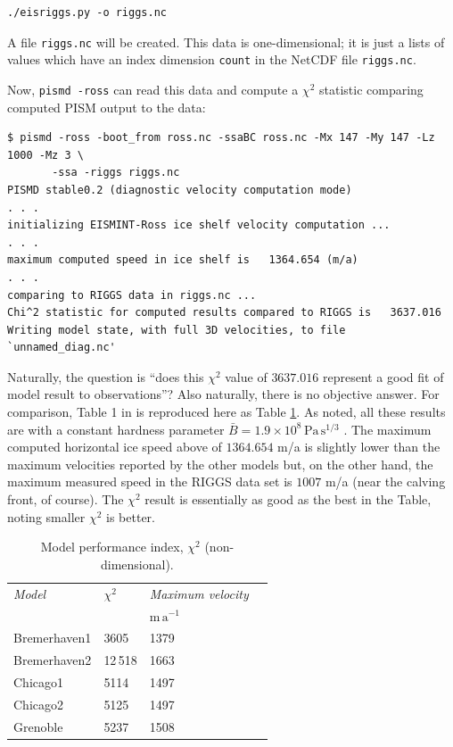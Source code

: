 \documentclass[11pt,final]{amsart}
\begin{document}
\begin{verbatim}
./eisriggs.py -o riggs.nc
\end{verbatim}
A file \verb|riggs.nc| will be created.  This data is one-dimensional; it is just a lists of values which have an index dimension \verb|count| in the NetCDF file \verb|riggs.nc|.

Now, \verb|pismd -ross| can read this data and compute a $\chi^2$ statistic comparing computed PISM output to the data:

\small
\begin{verbatim}
$ pismd -ross -boot_from ross.nc -ssaBC ross.nc -Mx 147 -My 147 -Lz 1000 -Mz 3 \
       -ssa -riggs riggs.nc
PISMD stable0.2 (diagnostic velocity computation mode)
. . .
initializing EISMINT-Ross ice shelf velocity computation ...
. . . 
maximum computed speed in ice shelf is   1364.654 (m/a)
. . .
comparing to RIGGS data in riggs.nc ...
Chi^2 statistic for computed results compared to RIGGS is   3637.016
Writing model state, with full 3D velocities, to file `unnamed_diag.nc'
\end{verbatim}
\normalsize

Naturally, the question is ``does this $\chi^2$ value of $3637.016$ represent a good fit of model result to observations''?  Also naturally, there is no objective answer.  For comparison, Table 1 in \cite{MacAyealetal} is reproduced here as Table \ref{tab:chisqr}.  As noted, all these results are with a constant hardness parameter $\bar B = 1.9 \times 10^8 \, \text{Pa}\, \text{s}^{1/3}$ \cite{MacAyealetal}. The maximum computed horizontal ice speed above of $1364.654$ m/a is slightly lower than the maximum velocities reported by the other models but, on the other hand, the maximum measured speed in the RIGGS data set is $1007$ m/a (near the calving front, of course).  The $\chi^2$ result is essentially as good as the best in the Table, noting smaller $\chi^2$ is better.

\small
\begin{table}[ht]
\caption{Model performance index, $\chi^2$ (non-dimensional).  }\label{tab:chisqr}
\begin{tabular}{@{}llll}\hline
\textsl{Model} & $\chi^2$ & \textsl{Maximum velocity} \\
 & & $\text{m}\,\text{a}^{-1}$ \\ \hline
Bremerhaven1 & 3605 & 1379 \\
Bremerhaven2 & 12\,518 & 1663 \\
Chicago1 & 5114 & 1497 \\
Chicago2 & 5125 & 1497 \\
Grenoble & 5237 & 1508 \\
\hline
\end{tabular}
\end{table}
\normalsize
\end{document}

